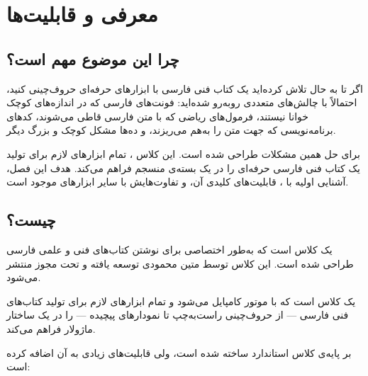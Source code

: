 
\chapter{معرفی و قابلیت‌ها}
\label{chap:introduction}

\section{چرا این موضوع مهم است؟}
\label{sec:introduction-why}

اگر تا به حال تلاش کرده‌اید یک کتاب فنی فارسی با
ابزارهای حرفه‌ای حروف‌چینی کنید، احتمالاً با
چالش‌های متعددی روبه‌رو شده‌اید: فونت‌های فارسی
که در اندازه‌های کوچک خوانا نیستند، فرمول‌های
ریاضی که با متن فارسی قاطی می‌شوند، کدهای
برنامه‌نویسی که جهت متن را به‌هم می‌ریزند، و
ده‌ها مشکل کوچک و بزرگ دیگر.

 برای حل همین مشکلات طراحی شده است.
این کلاس ، تمام ابزارهای لازم برای
تولید یک کتاب فنی فارسی حرفه‌ای را در یک بسته‌ی
منسجم فراهم می‌کند. هدف این فصل، آشنایی اولیه با
، قابلیت‌های کلیدی آن، و تفاوت‌هایش
با سایر ابزارهای موجود است.



\section{ چیست؟}
\label{sec:introduction-what}

 یک کلاس  است که به‌طور
اختصاصی برای نوشتن کتاب‌های فنی و علمی فارسی طراحی
شده است. این کلاس توسط متین محمودی توسعه یافته و
تحت مجوز  منتشر می‌شود.

\begin{definition}[\lr{MatinBook}]
     یک کلاس  است که با
    موتور  کامپایل می‌شود و تمام
    ابزارهای لازم برای تولید کتاب‌های فنی فارسی
    — از حروف‌چینی راست‌به‌چپ تا نمودارهای پیچیده —
    را در یک ساختار ماژولار فراهم می‌کند.
    \label{def:matinbook}
\end{definition}

 بر پایه‌ی کلاس استاندارد 
ساخته شده است، ولی قابلیت‌های زیادی به آن اضافه
کرده است:

